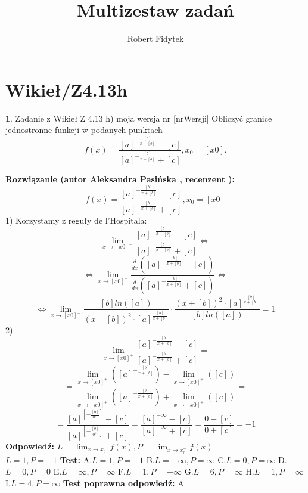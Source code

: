 \documentclass[12pt, a4paper]{article}
\title{Multizestaw zadań}
\author{Robert Fidytek}
\date{}
\theoremstyle{definition} %
\newtheorem{zad}{}
\newcommand{\kategoria}[1]{\section{#1}} %
\newcommand{\zadStart}[1]{\begin{zad}#1\newline} %
\newcommand{\zadStop}{\end{zad}}   %
\newcommand{\rozwStart}[2]{\noindent \textbf{Rozwiązanie (autor #1 , recenzent #2): }\newline} %
\newcommand{\rozwStop}{\newline}                                            %
\newcommand{\odpStart}{\noindent \textbf{Odpowiedź:}\newline}    %
\newcommand{\odpStop}{\newline}                                             %
\newcommand{\testStart}{\noindent \textbf{Test:}\newline} %
\newcommand{\testStop}{\newline} %
\newcommand{\kluczStart}{\noindent \textbf{Test poprawna odpowiedź:}\newline} %
\newcommand{\kluczStop}{\newline} %
\begin{document}
\maketitle


\kategoria{Wikieł/Z4.13h}
\zadStart{Zadanie z Wikieł Z 4.13 h) moja wersja nr [nrWersji]}
Obliczyć granice jednostronne funkcji w podanych punktach $$f(x)=\frac{[a]^{-\frac{[b]}{x+[b]}}-[c]}{[a]^{-\frac{[b]}{x+[b]}}+[c]},x_{0}=[x0].$$
\zadStop
\rozwStart{Aleksandra Pasińska}{}
$$f(x)=\frac{[a]^{-\frac{[b]}{x+[b]}}-[c]}{[a]^{-\frac{[b]}{x+[b]}}+[c]},x_{0}=[x0]$$
1) Korzystamy z reguły de l'Hospitala: \\
$$\lim_{x\rightarrow [x0]^-}\frac{[a]^{-\frac{[b]}{x+[b]}}-[c]}{[a]^{-\frac{[b]}{x+[b]}}+[c]}\Leftrightarrow$$ 
$$\Leftrightarrow \lim_{x\rightarrow [x0]^-}\frac{\frac{d}{dx}([a]^{-\frac{[b]}{x+[b]}}-[c])}{\frac{d}{dx}([a]^{-\frac{[b]}{x+[b]}}+[c])}\Leftrightarrow$$
$$\Leftrightarrow\lim_{x\rightarrow [x0]^-}\frac{[b]ln([a])}{(x+[b])^2\cdot [a]^{\frac{[b]}{x+[b]}}}\cdot \frac{(x+[b])^2\cdot [a]^{\frac{[b]}{x+[b]}}}{[b]ln([a])}=1$$ 
2)$$\lim_{x\rightarrow [x0]^+}\frac{[a]^{-\frac{[b]}{x+[b]}}-[c]}{[a]^{-\frac{[b]}{x+[b]}}+[c]}=$$
$$=\frac{\lim_{x\rightarrow [x0]^+}([a]^{-\frac{[b]}{x+[b]}})-\lim_{x\rightarrow [x0]^+}([c])}{\lim_{x\rightarrow [x0]^+}([a]^{-\frac{[b]}{x+[b]}})+\lim_{x\rightarrow [x0]^+}([c])}=$$
$$=\frac{[a]^{[-\frac{[b]}{0^+}]}-[c]}{[a]^{[-\frac{[b]}{0^+}]}+[c]}=\frac{[a]^{-\infty}-[c]}{[a]^{-\infty}+[c]}=\frac{0-[c]}{0+[c]}=-1$$
\rozwStop
\odpStart
$L=\lim_{x\rightarrow x_{0}^-}f(x),P=\lim_{x\rightarrow x_{0}^+}f(x)$\\
$L=1, P=-1$
\odpStop
\testStart
A.$L=1, P=-1$
B.$L=-\infty, P=\infty$
C.$L=0, P=\infty$
D.$L=0, P=0$
E.$L=\infty, P=\infty$
F.$L=1, P=-\infty$
G.$L=6, P=\infty$
H.$L=1, P=\infty$
I.$L=4, P=\infty$
\testStop
\kluczStart
A
\kluczStop
\end{document}
